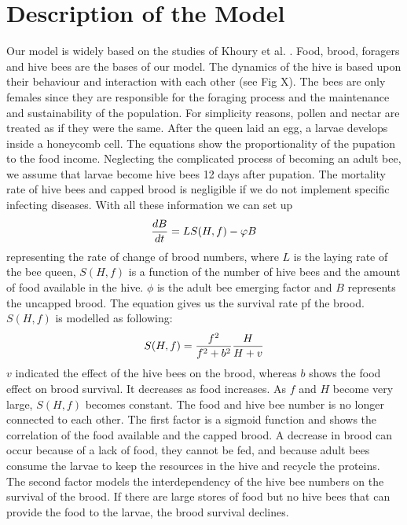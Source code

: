 \section{Description of the Model}
Our model is widely based on the studies of Khoury et al. \cite{khoury13}
. Food, brood, foragers and hive bees are the bases of our model. The dynamics of the hive is based upon their behaviour and interaction with each other (see Fig X). The bees are only females since they are responsible for the foraging process and the maintenance and sustainability of the population. For simplicity reasons, pollen and nectar are treated as if they were the same. After the queen laid an egg, a larvae develops inside a honeycomb cell. The equations show the proportionality of the pupation to the food income. Neglecting the complicated process of becoming an adult bee, we assume that larvae become hive bees 12 days after pupation. The mortality rate of hive bees and capped brood is negligible if we do not implement specific infecting diseases. With all these information we can set up
\begin{equation}\label{rate of change of brood numbers}
{dB \over dt} = LS(H,f)-\phi B
\end{equation}
representing the rate of change of brood numbers, where $L$ is the laying rate of the bee queen, $S(H,f)$ is a function of the number of hive bees and the amount of food available in the hive. $\phi$ is the adult bee emerging factor and $B$ represents the uncapped brood. The equation gives us the survival rate pf the brood. $S(H,f)$ is modelled as following:
\begin{equation}\label{function of hive bees and food}
S(H,f)={f^2 \over f^2+b^2}{H \over H+v}
\end{equation}
$v$ indicated the effect of the hive bees on the brood, whereas $b$ shows the food effect on brood survival. It decreases as food increases. As $f$ and $H$ become very large, $S(H,f)$ becomes constant. The food and hive bee number is no longer connected to each other. The first factor is a sigmoid function and shows the correlation of the food available and the capped brood. A decrease in brood can occur because of a lack of food, they cannot be fed, and because adult bees consume the larvae to keep the resources in the hive and recycle the proteins. The second factor models the interdependency of the hive bee numbers on the survival of the brood. If there are large stores of food but no hive bees that can provide the food to the larvae, the brood survival declines.  
\\

